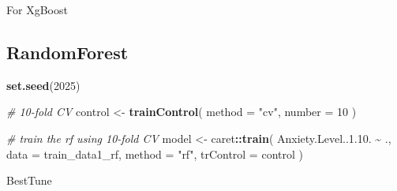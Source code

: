 \documentclass[
]{article}
\newenvironment{Shaded}{\begin{snugshade}}{\end{snugshade}}
\newcommand{\AttributeTok}[1]{\textcolor[rgb]{0.13,0.29,0.53}{#1}}
\newcommand{\CommentTok}[1]{\textcolor[rgb]{0.56,0.35,0.01}{\textit{#1}}}
\newcommand{\DecValTok}[1]{\textcolor[rgb]{0.00,0.00,0.81}{#1}}
\newcommand{\FloatTok}[1]{\textcolor[rgb]{0.00,0.00,0.81}{#1}}
\newcommand{\FunctionTok}[1]{\textcolor[rgb]{0.13,0.29,0.53}{\textbf{#1}}}
\newcommand{\NormalTok}[1]{#1}
\newcommand{\OtherTok}[1]{\textcolor[rgb]{0.56,0.35,0.01}{#1}}
\newcommand{\SpecialCharTok}[1]{\textcolor[rgb]{0.81,0.36,0.00}{\textbf{#1}}}
\newcommand{\StringTok}[1]{\textcolor[rgb]{0.31,0.60,0.02}{#1}}
\begin{document}
For XgBoost

\begin{Shaded}
\end{Shaded}

\subsection{RandomForest}\label{randomforest}

\begin{Shaded}
\begin{Highlighting}[]
\FunctionTok{set.seed}\NormalTok{(}\DecValTok{2025}\NormalTok{)}

\CommentTok{\# 10{-}fold CV}
\NormalTok{control }\OtherTok{\textless{}{-}} \FunctionTok{trainControl}\NormalTok{(}
  \AttributeTok{method =} \StringTok{"cv"}\NormalTok{, }
  \AttributeTok{number =} \DecValTok{10}
\NormalTok{  )}

\CommentTok{\# train the rf using 10{-}fold CV}
\NormalTok{model }\OtherTok{\textless{}{-}}\NormalTok{ caret}\SpecialCharTok{::}\FunctionTok{train}\NormalTok{(}
\NormalTok{  Anxiety.Level..}\DecValTok{1}\NormalTok{.}\FloatTok{10.} \SpecialCharTok{\textasciitilde{}}\NormalTok{ ., }
  \AttributeTok{data =}\NormalTok{ train\_data1\_rf, }
  \AttributeTok{method =} \StringTok{"rf"}\NormalTok{, }
  \AttributeTok{trControl =}\NormalTok{ control}
\NormalTok{  )}
\end{Highlighting}
\end{Shaded}

BestTune

\begin{Shaded}
\end{Shaded}
\end{document}
